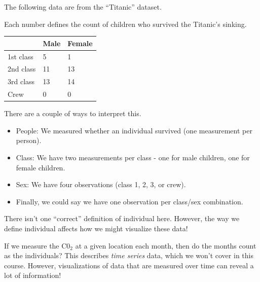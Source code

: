 \documentclass[
  letterpaper,
  DIV=11,
  numbers=noendperiod,
  oneside]{scrreprt}
\providecommand{\tightlist}{%
  \setlength{\itemsep}{0pt}\setlength{\parskip}{0pt}}\usepackage{longtable,booktabs,array}
\begin{document}
The following data are from the ``Titanic'' dataset.

Each number defines the count of children who survived the Titanic's
sinking.

\begin{longtable}[]{@{}lll@{}}
\toprule\noalign{}
& Male & Female \\
\midrule\noalign{}
\endhead
\bottomrule\noalign{}
\endlastfoot
1st class & 5 & 1 \\
2nd class & 11 & 13 \\
3rd class & 13 & 14 \\
Crew & 0 & 0 \\
\end{longtable}

There are a couple of ways to interpret this.

\begin{itemize}
\tightlist
\item
  People: We measured whether an individual survived (one measurement
  per person).
\item
  Class: We have two measurements per class - one for male children, one
  for female children.
\item
  Sex: We have four observations (class 1, 2, 3, or crew).
\item
  Finally, we could say we have one observation per class/sex
  combination.
\end{itemize}

There isn't one ``correct'' definition of individual here. However, the
way we define individual affects how we might visualize these data!

\begin{tcolorbox}[enhanced jigsaw, toprule=.15mm, colbacktitle=quarto-callout-warning-color!10!white, title=\textcolor{quarto-callout-warning-color}{\faExclamationTriangle}\hspace{0.5em}{CO\(_2\) Measurements}, arc=.35mm, colframe=quarto-callout-warning-color-frame, colback=white, titlerule=0mm, left=2mm, bottomtitle=1mm, bottomrule=.15mm, breakable, opacitybacktitle=0.6, leftrule=.75mm, toptitle=1mm, coltitle=black, rightrule=.15mm, opacityback=0]

If we measure the C0\(_2\) at a given location each month, then do the
months count as the individuals? This describes \emph{time series} data,
which we won't cover in this course. However, visualizations of data
that are measured over time can reveal a lot of
information!\footnotemark{}

\end{tcolorbox}
\end{document}
